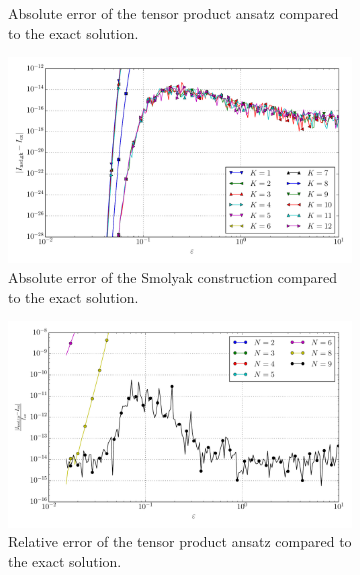 \documentclass[a4paper,10pt]{article}
\begin{document}
\begin{figure}[ht!]
\begin{subfigure}[t]{0.5\linewidth}
    \caption{Absolute error of the tensor product ansatz compared to the exact solution.}
    \label{fig:tp_sg_4d_conv_eps_8010_8100_err_nsd_tp}
  \end{subfigure}
  \begin{subfigure}[t]{0.5\linewidth}
    \includegraphics[width=\linewidth]{./plots/tp_sg_4d_conv_eps_(8,0,1,0)_(8,1,0,0)_err_nsd_gk.pdf}
    \caption{Absolute error of the Smolyak construction compared to the exact solution.}
    \label{fig:tp_sg_4d_conv_eps_8010_8100_err_nsd_gk}
  \end{subfigure}
  \begin{subfigure}[t]{0.5\linewidth}
    \includegraphics[width=\linewidth]{./plots/tp_sg_4d_conv_eps_(8,0,1,0)_(8,1,0,0)_err_rel_nsd_tp.pdf}
    \caption{Relative error of the tensor product ansatz compared to the exact solution.}
    \label{fig:tp_sg_4d_conv_eps_8010_8100_err_rel_nsd_tp}
  \end{subfigure}
  \begin{subfigure}[t]{0.5\linewidth}

\end{subfigure}
\end{figure}
\end{document}
